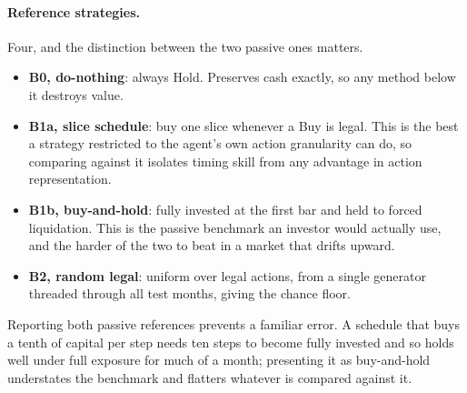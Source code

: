 \paragraph{Reference strategies.} Four, and the distinction between the
two passive ones matters.
\begin{itemize}
  \item \textbf{B0, do-nothing}: always Hold. Preserves cash exactly, so
        any method below it destroys value.
  \item \textbf{B1a, slice schedule}: buy one slice whenever a Buy is
        legal. This is the best a strategy restricted to the agent's own
        action granularity can do, so comparing against it isolates
        timing skill from any advantage in action representation.
  \item \textbf{B1b, buy-and-hold}: fully invested at the first bar and
        held to forced liquidation. This is the passive benchmark an
        investor would actually use, and the harder of the two to beat in
        a market that drifts upward.
  \item \textbf{B2, random legal}: uniform over legal actions, from a
        single generator threaded through all test months, giving the
        chance floor.
\end{itemize}
Reporting both passive references prevents a familiar error. A schedule
that buys a tenth of capital per step needs ten steps to become fully
invested and so holds well under full exposure for much of a month;
presenting it as buy-and-hold understates the benchmark and flatters
whatever is compared against it.

